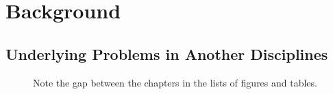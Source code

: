 \chapter{Background}\label{ch:background}

\chaptertoc

\noindent \kant[16]

\section{Underlying Problems in Another Disciplines}\label{sec:background-underlying}

\kant[17-20]

\begin{figure}[t!]
\centering
    \figbox{\rule{.1pt}{2cm} \rule[1cm]{2cm}{.1pt} \rule{.1pt}{2cm}}
	\caption[Note the gap above]{Note the gap between the chapters in the lists of figures and tables.}%
	\label{fig:background-example}%
\end{figure} 
